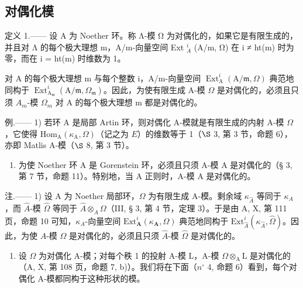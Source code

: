 \subsection{对偶化模}

定义 1.—— 设 A 为 Noether 环。称 Λ-模 Ω 为对偶化的，如果它是有限生成的，并且对 Λ 的每个极大理想 m，A/m-向量空间 Ext \(_{A}^{i}\) (A/m, Ω) 在 i ≠ ht(m) 时为零，而在 i = ht(m) 时维数为 1。

对 A 的每个极大理想 m 与每个整数 i，A/m-向量空间 \(\operatorname{Ext}_{\mathrm{A}}^{i}(\mathrm{A}/\mathfrak{m},\Omega)\) 典范地同构于 \(\operatorname{Ext}_{\mathrm{A}_{\mathfrak{m}}}^{i}(\mathrm{A}/\mathfrak{m},\Omega_{\mathfrak{m}})\)。因此，为使有限生成 A-模 \(\Omega\) 是对偶化的，必须且只须 \(A_{m}\)-模 \(\Omega_{m}\) 对 A 的每个极大理想 m 都是对偶化的。

例.—— 1) 若环 A 是局部 Artin 环，则对偶化 A-模就是有限生成的内射 A-模 \(\Omega\)，它使得 \(\mathrm{Hom}_{\mathrm{A}}(\kappa_{\mathrm{A}},\Omega)\)（记之为 \( E \)）的维数等于 1（\(\S\) 3, 第 3 节，命题 6），亦即 Matlis A-模（\(\S\) 8, 第 3 节）。

\begin{enumerate}
\def\labelenumi{\arabic{enumi})}
\setcounter{enumi}{1}
\tightlist
\item
  为使 Noether 环 A 是 Gorenstein 环，必须且只须 A-模 A 是对偶化的（§ 3, 第 7 节，命题 11）。特别地，当 A 正则时，A-模 A 是对偶化的。
\end{enumerate}

注.—— 1) 设 A 为 Noether 局部环，\(\Omega\) 为有限生成 A-模。剩余域 \(\kappa_{\widehat{A}}\) 等同于 \(\kappa_{A}\)，而 \(\widehat{A}\)-模 \(\widehat{\Omega}\) 等同于 \(\widehat{A} \otimes_{A} \Omega\)（III, § 3, 第 4 节，定理 3）。于是由 A, X, 第 111 页，命题 10 可知，\(\kappa_{A}\)-向量空间 \(\mathrm{Ext}_{\mathbf{A}}^{i}(\kappa_{\mathbf{A}}, \Omega)\) 典范地同构于 \(\mathrm{Ext}_{\widehat{A}}^{i}(\kappa_{\widehat{A}}, \widehat{\Omega})\)。因此，为使 \(A\)-模 \(\Omega\) 是对偶化的，必须且只须 \(\widehat{A}\)-模 \(\widehat{\Omega}\) 是对偶化的。

\begin{enumerate}
\def\labelenumi{\arabic{enumi})}
\setcounter{enumi}{1}
\tightlist
\item
  设 \(\Omega\) 为对偶化 A-模；对每个秩 1 的投射 A-模 L，A-模 \(\Omega\otimes_{\mathrm{A}}\mathrm{L}\) 是对偶化的（A, X, 第 108 页，命题 7, b)）。我们将在下面（\(n^{\circ}\) 4, 命题 6）看到，每个对偶化 A-模都同构于这种形状的模。
\end{enumerate}

